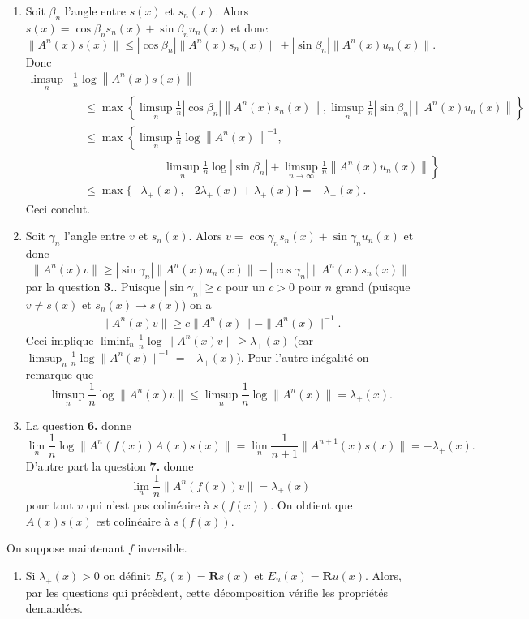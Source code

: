 \documentclass[a4paper,12pt,openany]{article}
\theoremstyle{plain}
\theoremstyle{definition}
\newcommand{\R}{\mathbf{R}}
\begin{document}
\begin{enumerate}
\item Soit $\beta_n$ l'angle entre $s(x)$ et $s_n(x)$. Alors $s(x) = \cos \beta_n s_n(x) + \sin \beta_n u_n(x)$ et donc
$$
\|A^n(x)s(x)\| \leqslant |\cos \beta_n| \|A^n(x)s_n(x)\| + |\sin \beta_n|\|A^n(x) u_n(x)\|.
$$
Donc 
$$
\begin{aligned}
\limsup _{n} &\frac{1}{n} \log \left\|A^{n}(x) s(x)\right\| \\
&\quad \leq \max \left\{\limsup _{n} \frac{1}{n}\left|\cos \beta_{n}\right|\left\|A^{n}(x) s_{n}(x)\right\|, \limsup _{n} \frac{1}{n}\left|\sin \beta_{n}\right|\left\|A^{n}(x) u_{n}(x)\right\|\right\} \\
&\quad \leq \max \left\{\limsup _{n} \frac{1}{n} \log \left\|A^{n}(x)\right\|^{-1},\right. \\
& \qquad \qquad \qquad  \qquad \left.\limsup _{n} \frac{1}{n} \log \left|\sin \beta_{n}\right|+\limsup _{n \rightarrow \infty} \frac{1}{n}\left\|A^{n}(x) u_{n}(x)\right\|\right\}
 \\
&\quad \leq \max \{-\lambda_+(x),-2 \lambda_+(x)+\lambda_+(x)\}=-\lambda_+(x).
\end{aligned}
$$
Ceci conclut.
\item Soit $\gamma_n$ l'angle entre $v$ et $s_n(x)$. Alors $v = \cos \gamma_n s_n(x) + \sin \gamma_n u_n(x)$ et donc
$$
\|A^n(x)v\| \geqslant |\sin \gamma_n| \|A^n(x) u_n(x)\| - |\cos \gamma_n| \|A^n(x) s_n(x)\|
$$
par la question \textbf{3.}.
Puisque $|\sin \gamma_n| \geqslant c$ pour un $c>0$ pour $n$ grand (puisque $v \neq s(x)$ et $s_n(x) \to s(x)$) on a 
$$
\begin{aligned}
\|A^n(x)v\| \geqslant c \|A^n(x)\| - \|A^n(x)\|^{-1}.
\end{aligned}
$$
Ceci implique $\liminf_n \frac{1}{n} \log \|A^n(x) v\| \geqslant \lambda_+(x)$ (car $\limsup_n \frac{1}{n} \log \|A^n(x)\|^{-1} = - \lambda_+(x)$). Pour l'autre in\'egalit\'e on remarque que
$$
\limsup_n \frac{1}{n} \log \|A^n(x)v\| \leqslant \limsup_n \frac{1}{n} \log \|A^n(x)\| = \lambda_+(x).
$$

\item La question \textbf{6.} donne
$$
\lim_n \frac{1}{n} \log \|A^n(f(x))A(x)s(x)\| = \lim_n \frac{1}{n+1} \|A^{n+1}(x)s(x)\| = -\lambda_+(x).
$$
D'autre part la question \textbf{7.} donne
$$
\lim_n \frac{1}{n} \|A^n(f(x))v\| = \lambda_+(x)
$$
pour tout $v$ qui n'est pas colin\'eaire \`a $s(f(x))$. On obtient que $A(x)s(x)$ est colin\'eaire \`a $s(f(x))$.
\end{enumerate}
\noindent On suppose maintenant $f$ inversible. 
\begin{enumerate}[resume]
\item Si $\lambda_+(x) > 0$ on d\'efinit $E_s(x) = \R s(x)$ et $E_u(x) = \R u (x)$. Alors, par les questions qui pr\'ec\`edent, cette d\'ecomposition v\'erifie les propri\'et\'es demand\'ees.\end{enumerate}
\end{document}
